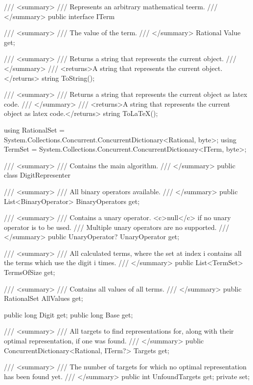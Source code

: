 \documentclass{article}
\theoremstyle{nonumberplain}
\begin{document}
\begin{lstcs}[]
/// <summary>
/// Represents an arbitrary mathematical teerm.
/// </summary>
public interface ITerm
{
    /// <summary>
    /// The value of the term.
    /// </summary>
    Rational Value { get; }

    /// <summary>
    /// Returns a string that represents the current object.
    /// </summary>
    /// <returns>A string that represents the current object.</returns>
    string ToString();

    /// <summary>
    /// Returns a string that represents the current object as latex code.
    /// </summary>
    /// <returns>A string that represents the current object as latex code.</returns>
    string ToLaTeX();
}
\end{lstcs}

\begin{lstcs}[]
using RationalSet = System.Collections.Concurrent.ConcurrentDictionary<Rational, byte>;
using TermSet = System.Collections.Concurrent.ConcurrentDictionary<ITerm, byte>;

/// <summary>
/// Contains the main algorithm.
/// </summary>
public class DigitRepresenter
{
    /// <summary>
    /// All binary operators available.
    /// </summary>
    public List<BinaryOperator> BinaryOperators { get; }

    /// <summary>
    /// Contains a unary operator. <c>null</c> if no unary operator is to be used.
    /// Multiple unary operators are no supported.
    /// </summary>
    public UnaryOperator? UnaryOperator { get; }

    /// <summary>
    /// All calculated terms, where the set at index i contains all the terms which use the digit i times.
    /// </summary>
    public List<TermSet> TermsOfSize { get; }

    /// <summary>
    /// Contains all values of all terms.
    /// </summary>
    public RationalSet AllValues { get; }

    public long Digit { get; }
    public long Base { get; }

    /// <summary>
    /// All targets to find representations for, along with their optimal representation, if one was found.
    /// </summary>
    public ConcurrentDictionary<Rational, ITerm?> Targets { get; }

    /// <summary>
    /// The number of targets for which no optimal representation has been found yet.
    /// </summary>
    public int UnfoundTargets { get; private set; }

}
\end{lstcs}
\end{document}

